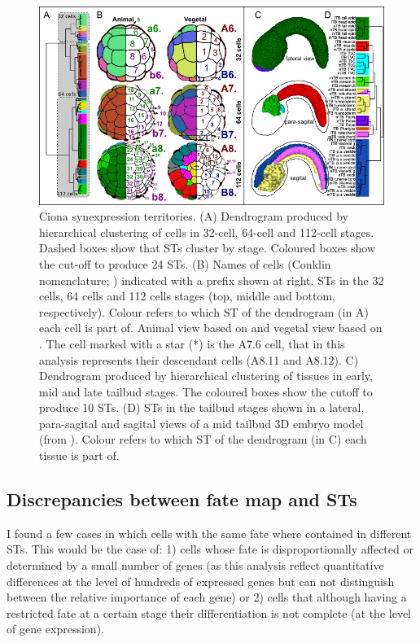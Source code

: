 \begin{figure}[h]
  \includegraphics[width=\textwidth]{./Images/Art-II/territories.png}
  \centering
  \caption{Ciona synexpression territories. 
  (A) Dendrogram produced by hierarchical clustering of cells in 32-cell, 64-cell and 112-cell stages. Dashed boxes show that STs cluster by stage. Coloured boxes show the cut-off to produce 24 STs.
  (B) Names of cells (Conklin nomenclature; \citealp{Conklin1905}) indicated with a prefix shown at right. STs in the 32 cells, 64 cells and 112 cells stages (top, middle and bottom, respectively). Colour refers to which ST of the dendrogram (in A) each cell is part of. Animal view based on \citet{Nicol1988} and vegetal view based on \citet{Cole2004a}. The cell marked with a star (*) is the A7.6 cell, that in this analysis represents their descendant cells (A8.11 and A8.12).
  C) Dendrogram produced by hierarchical clustering of tissues in early, mid and late tailbud stages. The coloured boxes show the cutoff to produce 10 STs. (D) STs in the tailbud stages shown in a lateral, para-sagital and sagital views of a mid tailbud 3D embryo model (from \citealp{Nakamura2012}). Colour refers to which ST of the dendrogram (in C) each tissue is part of.
}
  \label{fig:Art-II-territories}
\end{figure}

\subsection{Discrepancies between fate map and STs}

I found a few cases in which cells with the same fate where contained in different STs. This would be the case of: 1) cells whose fate is disproportionally affected or determined by a small number of genes (as this analysis reflect quantitative differences at the level of hundreds of expressed genes
but can not distinguish between the relative importance of each gene) or 2) cells that although having a restricted fate at a certain stage their differentiation is not complete (at the level of gene expression).

